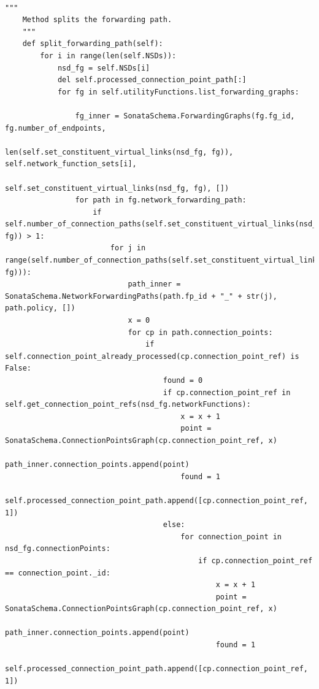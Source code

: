 \begin{lstlisting}[caption=Forwarding Graph Splitting, label=lis:FGSplitting]

"""
    Method splits the forwarding path.
    """
    def split_forwarding_path(self):
        for i in range(len(self.NSDs)):
            nsd_fg = self.NSDs[i]
            del self.processed_connection_point_path[:]
            for fg in self.utilityFunctions.list_forwarding_graphs:
                
                fg_inner = SonataSchema.ForwardingGraphs(fg.fg_id, fg.number_of_endpoints,
                                               len(self.set_constituent_virtual_links(nsd_fg, fg)), self.network_function_sets[i],
                                               self.set_constituent_virtual_links(nsd_fg, fg), [])
                for path in fg.network_forwarding_path:
                    if self.number_of_connection_paths(self.set_constituent_virtual_links(nsd_fg, fg)) > 1:
                        for j in range(self.number_of_connection_paths(self.set_constituent_virtual_links(nsd_fg, fg))):
                            path_inner = SonataSchema.NetworkForwardingPaths(path.fp_id + "_" + str(j), path.policy, [])
                            x = 0
                            for cp in path.connection_points:
                                if self.connection_point_already_processed(cp.connection_point_ref) is False:
                                    found = 0
                                    if cp.connection_point_ref in self.get_connection_point_refs(nsd_fg.networkFunctions):
                                        x = x + 1
                                        point = SonataSchema.ConnectionPointsGraph(cp.connection_point_ref, x)
                                        path_inner.connection_points.append(point)
                                        found = 1
                                        self.processed_connection_point_path.append([cp.connection_point_ref, 1])
                                    else:
                                        for connection_point in nsd_fg.connectionPoints:
                                            if cp.connection_point_ref == connection_point._id:
                                                x = x + 1
                                                point = SonataSchema.ConnectionPointsGraph(cp.connection_point_ref, x)
                                                path_inner.connection_points.append(point)
                                                found = 1
                                                self.processed_connection_point_path.append([cp.connection_point_ref, 1])

\end{lstlisting}
